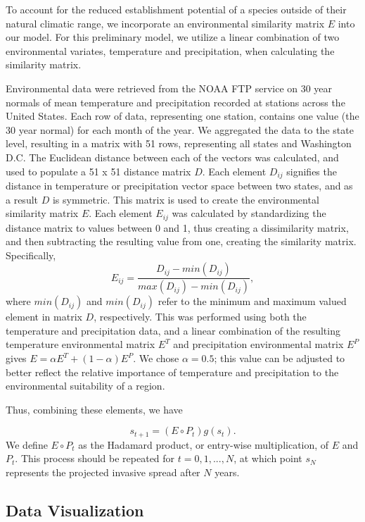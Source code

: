 \documentclass[12pt]{article}
\begin{document}
To account for the reduced establishment potential of a species outside of their natural climatic range, we incorporate an environmental similarity matrix $E$ into our model. For this preliminary model, we utilize a linear combination of two environmental variates, temperature and precipitation, when calculating the similarity matrix.

Environmental data were retrieved from the NOAA FTP service on 30 year normals of mean temperature and precipitation recorded at stations across the United States. Each row of data, representing one station, contains one value (the 30 year normal) for each month of the year. We aggregated the data to the state level, resulting in a matrix with 51 rows, representing all states and Washington D.C. The Euclidean distance between each of the vectors was calculated, and used to populate a 51 x 51 distance matrix $D$. Each element $D_{ij}$ signifies the distance in temperature or precipitation vector space between two states, and as a result $D$ is symmetric. This matrix is used to create the environmental similarity matrix $E$. Each element $E_{ij}$ was calculated by standardizing the distance matrix to values between 0 and 1, thus creating a dissimilarity matrix, and then subtracting the resulting value from one, creating the similarity matrix. Specifically,
\[
   E_{ij} = \frac{D_{ij} - min\left(D_{ij}\right)}{max\left(D_{ij}\right) - min\left(D_{ij}\right)},
\]
where $min(D_{ij})$ and $min(D_{ij})$ refer to the minimum and maximum valued element in matrix $D$, respectively.  This was performed using both the temperature and precipitation data, and a linear combination of the resulting temperature environmental matrix $E^{T}$ and precipitation environmental matrix $E^{P}$ gives $E = \alpha E^{T} + (1-\alpha) E^{P}$.  We chose $\alpha = 0.5$; this value can be adjusted to better reflect the relative importance of temperature and precipitation to the environmental suitability of a region.

Thus, combining these elements, we have

\[
	s_{t+1} = (E  \circ P_t) g(s_t).
\]
We define $E \circ P_t$ as the Hadamard product, or entry-wise multiplication, of $E$ and $P_t$.  This process should be repeated for $t=0,1,...,N$, at which point $s_N$ represents the projected invasive spread after $N$ years. 


\subsection*{Data Visualization}
\end{document}
